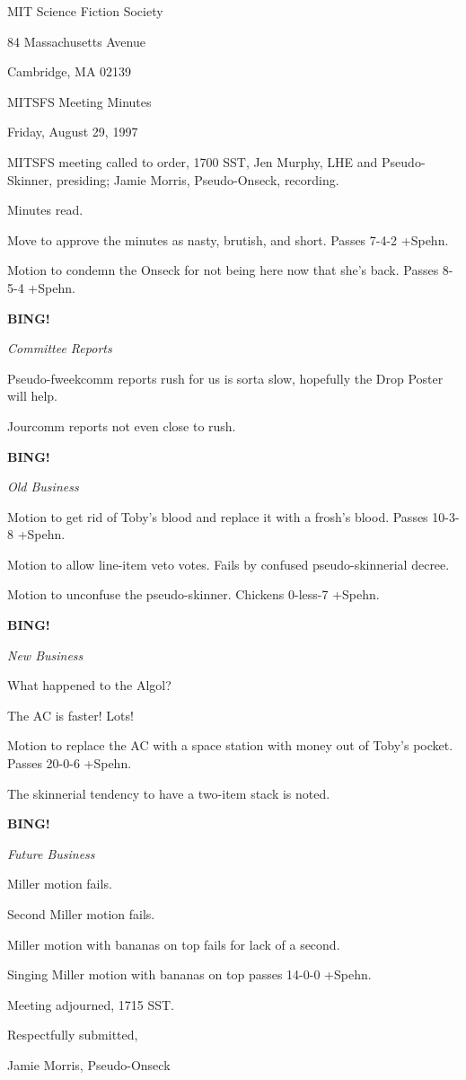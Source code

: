 \documentclass[12pt]{article}
\newcommand{\bing}{{\bf BING!} }
\newcommand{\goto}[1]{\bing \vskip 12pt \centerline{{\em{#1}}}}
\begin{document}
\begin{center}

MIT Science Fiction Society 

84 Massachusetts Avenue

Cambridge, MA 02139

\vspace{12pt}

MITSFS Meeting Minutes 

Friday, August 29, 1997

\end{center}
 
\vspace{18pt}

\setlength{\parskip}{6pt}

\noindent
MITSFS meeting called to order, 1700 SST,
Jen Murphy, LHE and Pseudo-Skinner, presiding; Jamie Morris, Pseudo-Onseck, recording.

Minutes read.

Move to approve the minutes as nasty, brutish, and short. Passes 7-4-2 +Spehn.

Motion to condemn the Onseck for not being here now that she's back. Passes 8-5-4 +Spehn.

\goto{Committee Reports}

Pseudo-fweekcomm reports rush for us is sorta slow, hopefully the Drop Poster will help.

Jourcomm reports not even close to rush.

\goto{Old Business}

Motion to get rid of Toby's blood and replace it with a frosh's blood. Passes 10-3-8 +Spehn.

Motion to allow line-item veto votes. Fails by confused pseudo-skinnerial decree.

Motion to unconfuse the pseudo-skinner. Chickens 0-less-7 +Spehn.

\goto{New Business}

What happened to the Algol?

The AC is faster! Lots!

Motion to replace the AC with a space station with money out of Toby's pocket. Passes 20-0-6 +Spehn.

The skinnerial tendency to have a two-item stack is noted.

\goto{Future Business}

Miller motion fails.

Second Miller motion fails.

Miller motion with bananas on top fails for lack of a second.

Singing Miller motion with bananas on top passes 14-0-0 +Spehn.

\vspace{12pt}

\noindent
Meeting adjourned, 1715 SST.

\vspace{18pt}

\centerline{Respectfully submitted,}
\centerline{Jamie Morris, Pseudo-Onseck}
\end{document}
